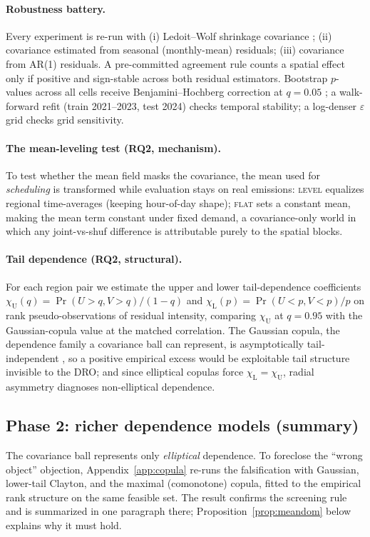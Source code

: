 \documentclass[12pt]{article}
\newcommand{\chiU}{\chi_{\mathrm{U}}}
\newcommand{\chiL}{\chi_{\mathrm{L}}}
\begin{document}
\paragraph{Robustness battery.} Every experiment is re-run with (i) Ledoit--Wolf
shrinkage covariance \citep{ledoit2004}; (ii) covariance estimated from seasonal
(monthly-mean) residuals; (iii) covariance from AR(1) residuals. A pre-committed
agreement rule counts a spatial effect only if positive and sign-stable across
both residual estimators. Bootstrap $p$-values across all cells receive
Benjamini--Hochberg correction at $q=0.05$ \citep{benjamini1995}; a walk-forward
refit (train 2021--2023, test 2024) checks temporal stability; a log-denser
$\varepsilon$ grid checks grid sensitivity.

\paragraph{The mean-leveling test (RQ2, mechanism).} To test whether the mean field masks the
covariance, the mean used for \emph{scheduling} is transformed while evaluation
stays on real emissions: \textsc{level} equalizes regional time-averages (keeping
hour-of-day shape); \textsc{flat} sets a constant mean, making the mean term
constant under fixed demand, a covariance-only world in which any joint-vs-shuf
difference is attributable purely to the spatial blocks.

\paragraph{Tail dependence (RQ2, structural).} For each region pair we estimate
the upper and lower tail-dependence coefficients
$\chiU(q)=\Pr(U>q,V>q)/(1-q)$ and $\chiL(p)=\Pr(U<p,V<p)/p$ on rank
pseudo-observations of residual intensity, comparing $\chiU$ at $q=0.95$ with the
Gaussian-copula value at the matched correlation. The Gaussian copula, the dependence
family a covariance ball can represent, is asymptotically tail-independent
\citep{embrechts2002}, so a positive empirical excess would be exploitable tail
structure invisible to the DRO; and since elliptical copulas force $\chiL=\chiU$,
radial asymmetry diagnoses non-elliptical dependence.

\subsection{Phase 2: richer dependence models (summary)}\label{sec:method-copula}
The covariance ball represents only \emph{elliptical} dependence. To foreclose the
``wrong object'' objection, Appendix~\ref{app:copula} re-runs the falsification with
Gaussian, lower-tail Clayton, and the maximal (comonotone) copula, fitted to the
empirical rank structure on the same feasible set. The result confirms the screening
rule and is summarized in one paragraph there; Proposition~\ref{prop:meandom} below
explains why it must hold.
\end{document}
